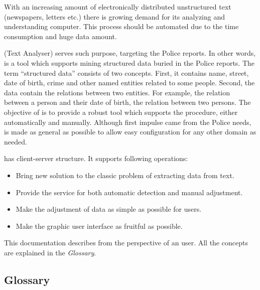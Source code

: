 
With an increasing amount of electronically distributed unstructured text (newspapers, letters etc.) there is growing demand for its analyzing and understanding computer. This process should be automated due to the time consumption and huge data amount.

\textan{} (Text Analyser) serves such purpose, targeting the Police reports. 
In other words, \textan{} is a tool which supports mining structured data buried in the Police reports. The term ``structured data'' consists of two concepts. 
First, it contains name, street, date of birth, crime and other named entities related to some people. 
Second, the data contain the relations between two entities. 
For example, the relation between a person and their date of birth, the relation between two persons. The objective of \textan{} is to provide a robust tool which supports the procedure, either automatically and manually.
Although first impulse came from the Police needs, \textan{} is made as general
as possible to allow easy configuration for any other domain as needed.

\textan{} has client-server structure. It supports following operations:
  
  \begin{itemize}
  \item Bring new solution to the classic problem of extracting data from text.
  \item Provide the service for both automatic detection and manual adjustment.
  \item Make the adjustment of data as simple as possible for users.
  \item Make the graphic user interface as fruitful as possible.
  \end{itemize}

This documentation describes \textan{} from the perspective of an user. 
All the concepts are explained in the \emph{Glossary}.

\subsection{Glossary}

